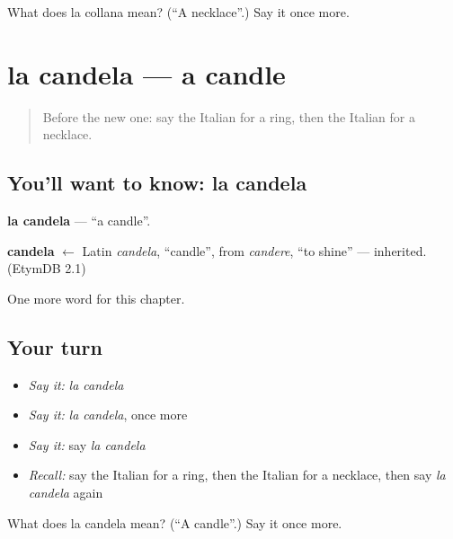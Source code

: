 \begin{tcolorbox}[breakable,colback=teal!4,colframe=teal!35!black,title={Before you move on}]
What does la collana mean? (\textquotedblleft{}A necklace\textquotedblright{}.) Say it once more.
\end{tcolorbox}
\section[la candela]{la candela — a candle}

\label{lesson:IT-C101-candela}



\begin{quote}
Before the new one: say the Italian for a ring, then the Italian for a necklace.
\end{quote}

\subsection*{You'll want to know: la candela}
\textbf{la candela} — \textquotedblleft{}a candle\textquotedblright{}.

\begin{cousinweb}
\textbf{candela} $\leftarrow$ Latin \emph{candela}, \textquotedblleft{}candle\textquotedblright{}, from \emph{candere}, \textquotedblleft{}to shine\textquotedblright{} — inherited. (EtymDB 2.1)
\end{cousinweb}

\begin{grammarlens}[title={What you've built}]
One more word for this chapter.
\end{grammarlens}

\subsection*{Your turn}
\begin{itemize}
\raggedright
  \item \emph{Say it:} \emph{la candela}
  \item \emph{Say it:} \emph{la candela}, once more
  \item \emph{Say it:} say \emph{la candela}
  \item \emph{Recall:} say the Italian for a ring, then the Italian for a necklace, then say \emph{la candela} again
\end{itemize}

\begin{tcolorbox}[breakable,colback=teal!4,colframe=teal!35!black,title={Before you move on}]
What does la candela mean? (\textquotedblleft{}A candle\textquotedblright{}.) Say it once more.
\end{tcolorbox}
